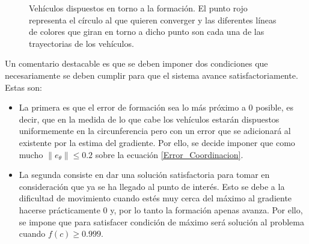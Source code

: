 \begin{figure}[H]
  \begin{center}
    \caption{Vehículos dispuestos en torno a la formación. El punto rojo representa el círculo al que quieren converger y las diferentes líneas de colores que giran en torno a dicho punto son cada una de las trayectorias de los vehículos.}
    \label{Demostracion_Coordinacion}
  \end{center}
\end{figure}
Un comentario destacable es que se deben imponer dos condiciones que necesariamente se deben cumplir para que el sistema avance satisfactoriamente. Estas son:

\begin{itemize}
	\item La primera es que el error de formación sea lo más próximo a 0 posible, es decir, que en la medida de lo que cabe los vehículos estarán dispuestos uniformemente en la circunferencia pero con un error que se adicionará al existente por la estima del gradiente. Por ello, se decide imponer que como mucho $\|e_{\theta}\|\leq{0.2}$ sobre la ecuación \ref{Error_Coordinacion}.
	\item La segunda consiste en dar una solución satisfactoria para tomar en consideración que ya se ha llegado al punto de interés. Esto se debe a la dificultad de movimiento cuando estés muy cerca del máximo al gradiente hacerse prácticamente 0 y, por lo tanto la formación apenas avanza. Por ello, se impone que para satisfacer condición de máximo será solución al problema cuando $f(c)\geq{0.999}$.
\end{itemize}

